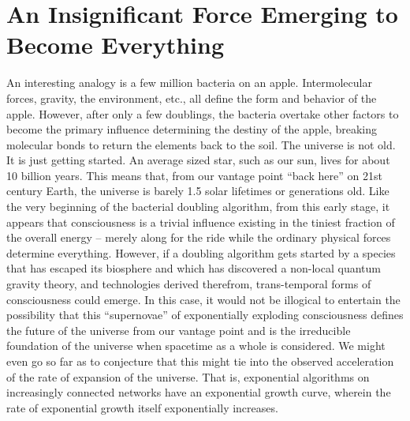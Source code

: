 \documentclass[submission,copyright,creativecommons]{eptcs}
\begin{document}
\section{An Insignificant Force Emerging to Become Everything}
\label{sec:9}
An interesting analogy is a few million bacteria on an apple. Intermolecular forces, gravity, the environment, etc., all define the form and behavior of the apple. However, after only a few doublings, the bacteria overtake other factors to become the primary influence determining the destiny of the apple, breaking molecular bonds to return the elements back to the soil. The universe is not old. It is just getting started. An average sized star, such as our sun, lives for about 10 billion years. This means that, from our vantage point “back here” on 21st century Earth, the universe is barely 1.5 solar lifetimes or generations old. Like the very beginning of the bacterial doubling algorithm, from this early stage, it appears that consciousness is a trivial influence existing in the tiniest fraction of the overall energy -- merely along for the ride while the ordinary physical forces determine everything. However, if a doubling algorithm gets started by a species that has escaped its biosphere and which has discovered a non-local quantum gravity theory, and technologies derived therefrom, trans-temporal forms of consciousness could emerge. In this case, it would not be illogical to entertain the possibility that this “supernovae” of exponentially exploding consciousness defines the future of the universe from our vantage point and is the irreducible foundation of the universe when spacetime as a whole is considered. We might even go so far as to conjecture that this might tie into the observed acceleration of the rate of expansion of the universe. That is, exponential algorithms on increasingly connected networks have an exponential growth curve, wherein the rate of exponential growth itself exponentially increases.
\end{document}
